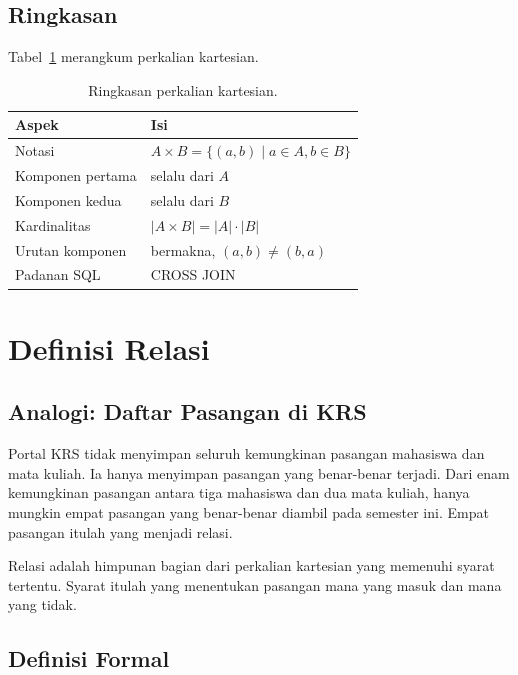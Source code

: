 \documentclass[11pt,a4paper]{article}
\begin{document}
\subsection{Ringkasan}

Tabel~\ref{tab:kartesian} merangkum perkalian kartesian.

\begin{table}[H]
	\centering
	\caption{Ringkasan perkalian kartesian.}
	\label{tab:kartesian}
	\small
	\begin{tabularx}{\textwidth}{l X}
		\toprule
		Aspek            & Isi                                          \\
		\midrule
		Notasi           & $A \times B=\{(a,b) \mid a \in A, b \in B\}$ \\
		Komponen pertama & selalu dari $A$                              \\
		Komponen kedua   & selalu dari $B$                              \\
		Kardinalitas     & $|A \times B|=|A| \cdot |B|$                 \\
		Urutan komponen  & bermakna, $(a,b) \ne (b,a)$                  \\
		Padanan SQL      & CROSS JOIN                                   \\
		\bottomrule
	\end{tabularx}
\end{table}

\section{Definisi Relasi}

\subsection{Analogi: Daftar Pasangan di KRS}

Portal KRS tidak menyimpan seluruh kemungkinan pasangan mahasiswa dan mata kuliah. Ia hanya menyimpan pasangan yang benar-benar terjadi. Dari enam kemungkinan pasangan antara tiga mahasiswa dan dua mata kuliah, hanya mungkin empat pasangan yang benar-benar diambil pada semester ini. Empat pasangan itulah yang menjadi relasi.

Relasi adalah himpunan bagian dari perkalian kartesian yang memenuhi syarat tertentu. Syarat itulah yang menentukan pasangan mana yang masuk dan mana yang tidak.

\subsection{Definisi Formal}
\end{document}

